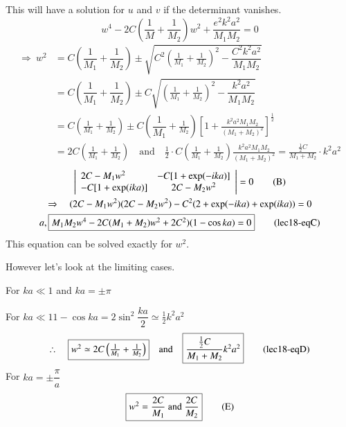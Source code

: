 This will have a solution for $u$ and $v$ if the determinant vanishes.
$$
w^{4}-2C\left(\frac{1}{M}+\frac{1}{M_{2}}\right)w^{2}+\dfrac{e^{2}k^{2}a^{2}}{M_{1}M_{2}}=0
$$
\begin{align*}
\Rightarrow \ w^{2} &= C\left(\dfrac{1}{M_{1}}+\dfrac{1}{M_{2}}\right)\pm \sqrt{C^{2}\left(\frac{1}{M_{1}}+\frac{1}{M_{2}}\right)^{2}-\dfrac{C^{2}k^{2}a^{2}}{M_{1}M_{2}}}\\
&= C\left(\dfrac{1}{M_{1}}+\dfrac{1}{M_{2}}\right)\pm C\sqrt{\left(\frac{1}{M_{1}}+\frac{1}{M_{2}}\right)^{2}-\dfrac{k^{2}a^{2}}{M_{1}M_{2}}}\\
&= C\left(\frac{1}{M_{1}}+\frac{1}{M_{2}}\right)\pm C\left(\dfrac{1}{M_{1}}+\frac{1}{M_{2}}\right)\left[1+\frac{k^{2}a^{2}M_{1}M_{2}}{(M_{1}+M_{2})^{2}}\right]^{\frac{1}{2}}\\
&= 2C\left(\frac{1}{M_{1}}+\frac{1}{M_{2}}\right)\quad\text{and}\quad \frac{1}{2}\cdot C\left(\frac{1}{M_{1}}+\frac{1}{M_{2}}\right)\frac{k^{2}a^{2}M_{1}M_{2}}{(M_{1}+M_{2})^{2}}=\frac{\frac{1}{2}C}{M_{1}+M_{2}}\cdot k^{2}a^{2}
\end{align*}
\begin{gather*}
\left|
\begin{array}{lc}
2C-M_{1}w^{2} & -C[1+\exp(-ika)]\\
-C[1+\exp(ika)] & 2C-M_{2}w^{2}
\end{array}
\right|=0
\tag{B}\label{lec18-eqB}\\
\Rightarrow\quad (2C-M_{1}w^{2})(2C-M_{2}w^{2})-C^{2}(2+\exp(-ika)+\exp(ika))=0\\
a, \fbox{$M_{1}M_{2}w^{4}-2C(M_{1}+M_{2})w^{2}+2C^{2})(1-\cos ka)=0$}\tag{lec18-eqC}
\end{gather*}
This equation can be solved exactly for $w^{2}$.

However let's look at the limiting cases.

For $ka\ll 1$ and $ka=\pm \pi$

For $ka\ll 1$\quad $1-\cos ka=2\sin^{2}\dfrac{ka}{2}\simeq \frac{1}{2}k^{2}a^{2}$
\begin{equation*}
\therefore\quad \fbox{$w^{2}\simeq 2C\left(\frac{1}{M_{1}}+\frac{1}{M_{2}}\right)$}\quad\text{and}\quad \fbox{$\dfrac{\frac{1}{2}C}{M_{1}+M_{2}}k^{2}a^{2}$}\tag{lec18-eqD}
\end{equation*}
For $ka=\pm \dfrac{\pi}{a}$
\begin{equation*}
\fbox{$w^{2}=\dfrac{2C}{M_{1}}$ and $\dfrac{2C}{M_{2}}$}\tag{E}\label{lec18-eqE}
\end{equation*}

